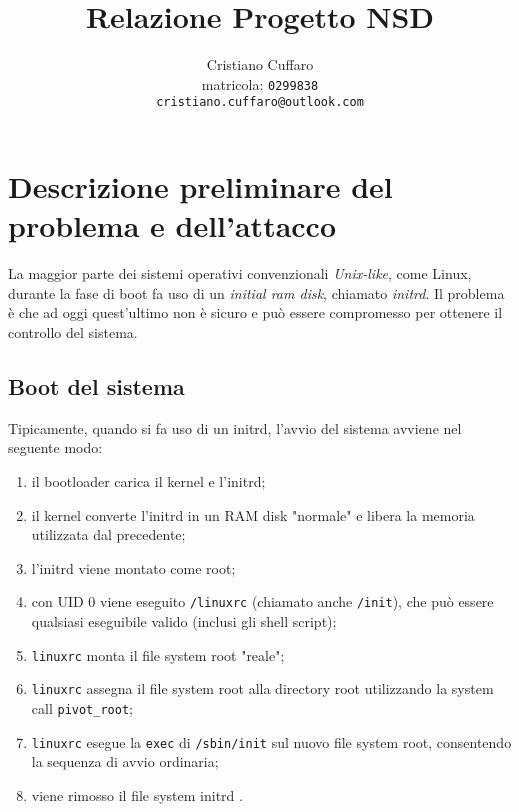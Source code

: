 \documentclass{article}
\begin{document}
\author{%
	Cristiano Cuffaro \\
	{\small matricola: \texttt{0299838}} \\
	{\small \texttt{cristiano.cuffaro@outlook.com}}
}
\title{Relazione Progetto NSD}

\begin{titlingpage}		
	\maketitle
	\tableofcontents
\end{titlingpage}

\newpage

\section{Descrizione preliminare del problema e dell'attacco}
La maggior parte dei sistemi operativi convenzionali \textsl{Unix-like}, come Linux, durante la fase di boot fa uso di un \textsl{initial ram disk}, chiamato \textsl{initrd}. Il problema è che ad oggi quest'ultimo non è sicuro e può essere compromesso per ottenere il controllo del sistema.

\subsection{Boot del sistema}
Tipicamente, quando si fa uso di un initrd, l'avvio del sistema avviene nel seguente modo:
\begin{enumerate}
	\item il bootloader carica il kernel e l'initrd;
	\item il kernel converte l'initrd in un RAM disk "normale" e libera la memoria utilizzata dal precedente;
	\item l'initrd viene montato come root;
	\item con UID 0 viene eseguito \texttt{/linuxrc} (chiamato anche \texttt{/init}), che può essere qualsiasi eseguibile valido (inclusi gli shell script);
	\item \texttt{linuxrc} monta il file system root "reale";
	\item \texttt{linuxrc} assegna il file system root alla directory root utilizzando la system call \texttt{pivot\_root};
	\item \texttt{linuxrc} esegue la \texttt{exec} di \texttt{/sbin/init} sul nuovo file system root, consentendo la sequenza di avvio ordinaria;
	\item viene rimosso il file system initrd \cite{initrd}.
\end{enumerate}
\end{document}

